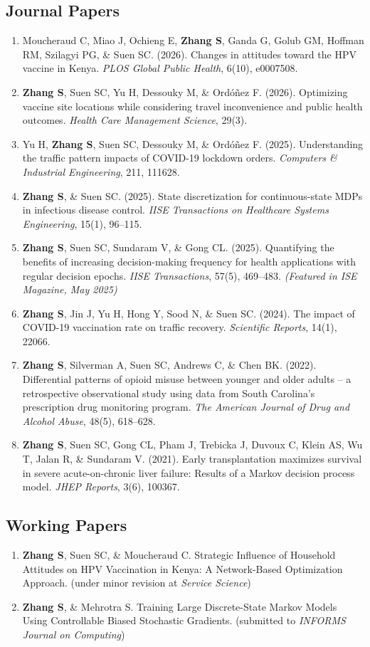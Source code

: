 \documentclass[11pt,letterpaper]{article}
\newcommand{\me}{\textbf{Zhang S}}
\begin{document}
\subsection*{Journal Papers}
\begin{enumerate}
  \item Moucheraud C, Miao J, Ochieng E, \me, Ganda G, Golub GM, Hoffman RM, Szilagyi PG, \& Suen SC. (2026).
        Changes in attitudes toward the HPV vaccine in Kenya. \emph{PLOS Global Public Health}, 6(10), e0007508.
  \item \me, Suen SC, Yu H, Dessouky M, \& Ord\'o\~nez F. (2026). Optimizing vaccine site locations while
        considering travel inconvenience and public health outcomes. \emph{Health Care Management Science}, 29(3).
  \item Yu H, \me, Suen SC, Dessouky M, \& Ord\'o\~nez F. (2025). Understanding the traffic pattern impacts of
        COVID-19 lockdown orders. \emph{Computers \& Industrial Engineering}, 211, 111628.
  \item \me, \& Suen SC. (2025). State discretization for continuous-state MDPs in infectious disease control.
        \emph{IISE Transactions on Healthcare Systems Engineering}, 15(1), 96--115.
  \item \me, Suen SC, Sundaram V, \& Gong CL. (2025). Quantifying the benefits of increasing decision-making
        frequency for health applications with regular decision epochs. \emph{IISE Transactions}, 57(5), 469--483.
        \emph{(Featured in ISE Magazine, May 2025)}
  \item \me, Jin J, Yu H, Hong Y, Sood N, \& Suen SC. (2024). The impact of COVID-19 vaccination rate on traffic
        recovery. \emph{Scientific Reports}, 14(1), 22066.
  \item \me, Silverman A, Suen SC, Andrews C, \& Chen BK. (2022). Differential patterns of opioid misuse between
        younger and older adults -- a retrospective observational study using data from South Carolina's
        prescription drug monitoring program. \emph{The American Journal of Drug and Alcohol Abuse}, 48(5), 618--628.
  \item \me, Suen SC, Gong CL, Pham J, Trebicka J, Duvoux C, Klein AS, Wu T, Jalan R, \& Sundaram V. (2021).
        Early transplantation maximizes survival in severe acute-on-chronic liver failure: Results of a Markov
        decision process model. \emph{JHEP Reports}, 3(6), 100367.
\end{enumerate}

\subsection*{Working Papers}
\begin{enumerate}
  \item \me, Suen SC, \& Moucheraud C. Strategic Influence of Household Attitudes on HPV Vaccination in Kenya:
        A Network-Based Optimization Approach. (under minor revision at \emph{Service Science})
  \item \me, \& Mehrotra S. Training Large Discrete-State Markov Models Using Controllable Biased Stochastic
        Gradients. (submitted to \emph{INFORMS Journal on Computing})
\end{enumerate}
\end{document}
